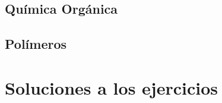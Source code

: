 \documentclass[
    11pt, %
    a4paper, %
]{LegrandOrangeBookES}
\begin{document}


    \chapter{Química Orgánica}

    

    \newpage

    


    \chapter{Polímeros}

    

    




    \pagestyle{empty} %









    \part{Soluciones a los ejercicios}



\end{document}
